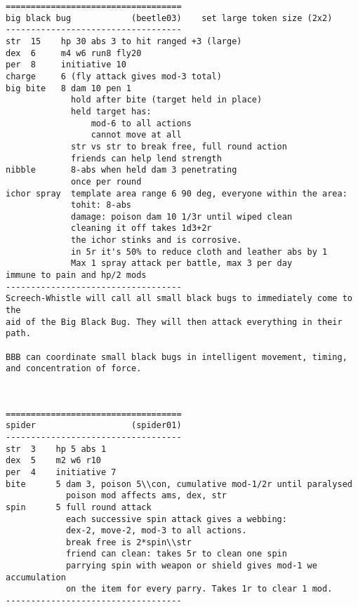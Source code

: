\goodbreak \begin{samepage} \small \begin{verbatim}
===================================
big black bug            (beetle03)    set large token size (2x2)
-----------------------------------
str  15    hp 30 abs 3 to hit ranged +3 (large)
dex  6     m4 w6 run8 fly20
per  8     initiative 10
charge     6 (fly attack gives mod-3 total)
big bite   8 dam 10 pen 1
             hold after bite (target held in place)
             held target has:
                 mod-6 to all actions
                 cannot move at all
             str vs str to break free, full round action
             friends can help lend strength
nibble       8-abs when held dam 3 penetrating
             once per round
ichor spray  template area range 6 90 deg, everyone within the area:
             tohit: 8-abs
             damage: poison dam 10 1/3r until wiped clean
             cleaning it off takes 1d3+2r
             the ichor stinks and is corrosive.
             in 5r it's 50% to reduce cloth and leather abs by 1
             Max 1 spray attack per battle, max 3 per day
immune to pain and hp/2 mods
-----------------------------------
Screech-Whistle will call all small black bugs to immediately come to the
aid of the Big Black Bug. They will then attack everything in their path.

BBB can coordinate small black bugs in intelligent movement, timing,
and concentration of force.
\end{verbatim} \normalsize \end{samepage}

\

\goodbreak \begin{samepage} \small \begin{verbatim}
===================================
spider                   (spider01)
-----------------------------------
str  3    hp 5 abs 1
dex  5    m2 w6 r10
per  4    initiative 7
bite      5 dam 3, poison 5\\con, cumulative mod-1/2r until paralysed
            poison mod affects ams, dex, str
spin      5 full round attack
            each successive spin attack gives a webbing:
            dex-2, move-2, mod-3 to all actions.
            break free is 2*spin\\str
            friend can clean: takes 5r to clean one spin
            parrying spin with weapon or shield gives mod-1 we accumulation
            on the item for every parry. Takes 1r to clear 1 mod.
-----------------------------------
\end{verbatim} \normalsize \end{samepage}

